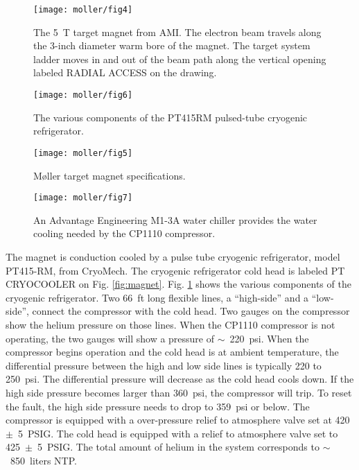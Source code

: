 {   \begin{figure}%
      \begin{center}
         \texttt{[image: moller/fig4]}
      \end{center}
      \caption[High-field Target Magnet]{The 5~T target magnet from AMI. The electron beam travels along the 3-inch diameter warm bore of the magnet. The target system ladder moves in and out of the beam path along the vertical opening labeled RADIAL ACCESS on the drawing.}
      \label{fig:magnet} 
      \begin{center}
          \texttt{[image: moller/fig6]}
      \end{center}
      \caption[PT415RM Pulsed-tube Cryogenic Refrigerator]{The various components of the 
               PT415RM pulsed-tube cryogenic refrigerator.}
      \label{fig:refrigirator} 
   \end{figure} 

\begin{figure}
\begin{minipage}[c]{0.6\linewidth}
\texttt{[image: moller/fig5]}
\caption[M{\o}ller target magnet specifications]{M{\o}ller target magnet specifications.}
 \label{fig:specifications} 
\end{minipage}
\hfill
\begin{minipage}[c]{0.3\linewidth}
\texttt{[image: moller/fig7]}
\caption[Advantage Engineering M1-3A water chiller]{An Advantage Engineering M1-3A water chiller provides the water cooling needed by the CP1110 compressor.}
 \label{fig:water_chiller} 
\end{minipage}%
\end{figure}
    

The magnet is conduction cooled by a pulse tube cryogenic refrigerator, model PT415-RM,  from CryoMech. The cryogenic refrigerator cold head is labeled PT CRYOCOOLER on Fig. \ref{fig:magnet}. 
Fig. \ref{fig:refrigirator} shows the various components of the cryogenic refrigerator.
Two 66~ft long flexible lines, a ``high-side'' and a ``low-side'', connect the compressor with the cold head. Two gauges on the compressor show the helium pressure on those lines. When the CP1110 compressor is not operating, the two gauges will show a pressure of $\sim$~220~psi. When the compressor begins operation and the cold head is at ambient temperature, the differential pressure between the high and low side lines is typically 220 to 250~psi. The differential pressure will decrease as the cold head cools down. If the high side pressure becomes larger than 360~psi, the compressor will trip. To reset the fault, the high side pressure needs to drop to 359~psi or below. The compressor is equipped with a over-pressure relief to atmosphere valve set at 420~$\pm$~5~PSIG. The cold head is equipped with a relief to atmosphere valve set to 425~$\pm$~5~PSIG. The total amount of helium in the system corresponds to $\sim$~850~liters NTP. 

}
